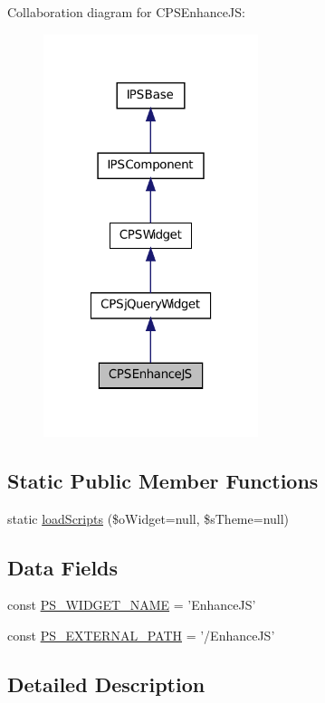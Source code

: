 Collaboration diagram for CPSEnhanceJS:\nopagebreak
\begin{figure}[H]
\begin{center}
\leavevmode
\includegraphics[width=178pt]{classCPSEnhanceJS__coll__graph}
\end{center}
\end{figure}
\subsection*{Static Public Member Functions}
\begin{DoxyCompactItemize}
\item 
static \hyperlink{classCPSEnhanceJS_a561cda05113b81fc962133829351f41e}{loadScripts} (\$oWidget=null, \$sTheme=null)
\end{DoxyCompactItemize}
\subsection*{Data Fields}
\begin{DoxyCompactItemize}
\item 
const \hyperlink{classCPSEnhanceJS_ae357f9dc377f7de0d12010b2ced28cbc}{PS\_\-WIDGET\_\-NAME} = 'EnhanceJS'
\item 
const \hyperlink{classCPSEnhanceJS_a8ccb5e1d65c091f944a6aa8c5be834ca}{PS\_\-EXTERNAL\_\-PATH} = '/EnhanceJS'
\end{DoxyCompactItemize}


\subsection{Detailed Description}


